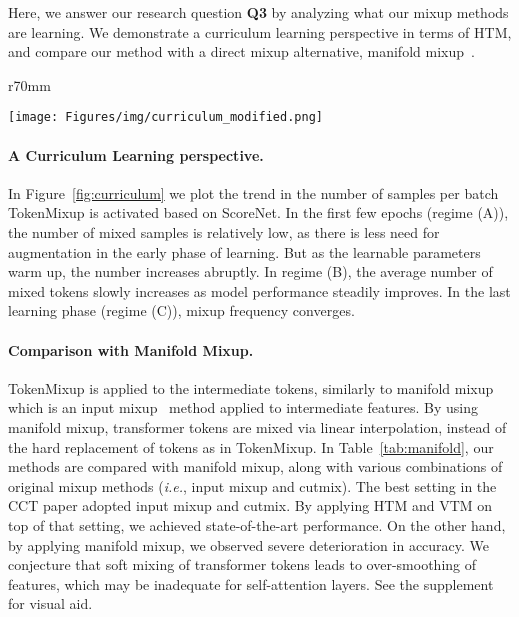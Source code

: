 \documentclass{article}
\begin{document}
 \vspace{-3mm}
Here, we answer our research question \textbf{Q3} by analyzing what our mixup methods are learning.
We demonstrate a curriculum learning perspective in terms of HTM, and compare our method with a direct mixup alternative, manifold mixup~\cite{verma2019manifold}.


\vspace{-3mm}
\begin{wrapfigure}{r}{70mm}
\vspace{-0.9cm}
\begin{center}
\texttt{[image: Figures/img/curriculum\_modified.png]}
\end{center}
\vspace{-5mm}
\caption{\footnotesize \textbf{Trend in the number of mixed instances.}}
\label{fig:curriculum}
\vspace{-0.8cm}
\end{wrapfigure}  \paragraph{A Curriculum Learning perspective.}
In Figure~\ref{fig:curriculum} we plot the trend in the number of samples per batch TokenMixup is activated based on ScoreNet.
In the first few epochs (regime (A)), the number of mixed samples is relatively low, as there is less need for augmentation in the early phase of learning.
But as the learnable parameters warm up, the number increases abruptly.
In regime (B), the average number of mixed tokens slowly increases as model performance steadily improves.
In the last learning phase (regime (C)), mixup frequency converges.

\vspace{-2mm}
\paragraph{Comparison with Manifold Mixup.}
TokenMixup is applied to the intermediate tokens, similarly to manifold mixup~\cite{verma2019manifold} which is an input mixup~\cite{zhang2017mixup} method applied to intermediate features.
By using manifold mixup, transformer tokens are mixed via linear interpolation, instead of the hard replacement of tokens as in TokenMixup.
In Table~\ref{tab:manifold}, our methods are compared with manifold mixup, along with various combinations of original mixup methods (\textit{i.e.}, input mixup and cutmix).
The best setting in the CCT paper adopted input mixup and cutmix. 
By applying HTM and VTM on top of that setting, we achieved state-of-the-art performance.
On the other hand, by applying manifold mixup, we observed severe deterioration in accuracy.
We conjecture that soft mixing of transformer tokens leads to over-smoothing of features, which may be inadequate for self-attention layers.
See the supplement for visual aid.
\end{document}
